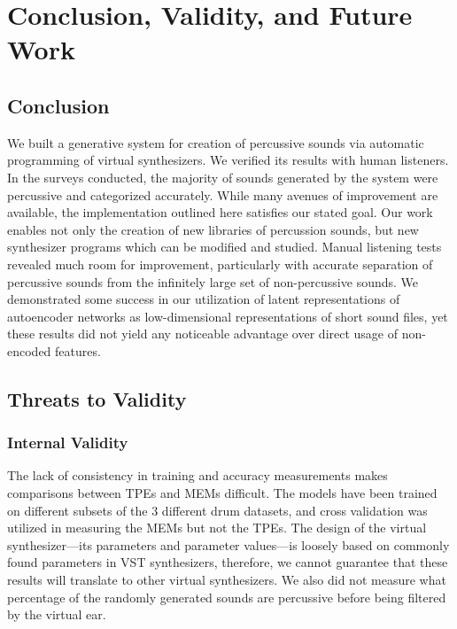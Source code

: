 \documentclass[\main/thesis.tex]{subfiles}
\begin{document}
\chapter{Conclusion, Validity, and Future Work} 

\section{Conclusion}  We built a generative system for creation of percussive sounds via automatic programming of virtual synthesizers. We verified its results with human listeners. In the surveys conducted, the majority of sounds generated by the system were percussive and categorized accurately. While many avenues of improvement are available, the implementation outlined here satisfies our stated goal. 
Our work enables not only the creation of new libraries of percussion sounds, but new synthesizer programs which can be modified and studied. 
Manual listening tests revealed much room for improvement, particularly with accurate separation of percussive sounds from the infinitely large set of non-percussive sounds. We demonstrated some success in our utilization of latent representations of autoencoder networks as low-dimensional representations of short sound files, yet these results did not yield any noticeable advantage over direct usage of non-encoded features.
\section{Threats to Validity}
\subsection{Internal Validity}
 The lack of consistency in training and accuracy measurements makes comparisons between TPEs and MEMs difficult. The models have been trained on different subsets of the 3 different drum datasets, and cross validation was utilized in measuring the MEMs but not the TPEs. The design of the virtual synthesizer---its parameters and parameter values---is loosely based on commonly found parameters in VST synthesizers, therefore, we cannot guarantee that these results will translate to other virtual synthesizers. We also did not measure what percentage of the randomly generated sounds are percussive before being filtered by the virtual ear. 
\end{document}
